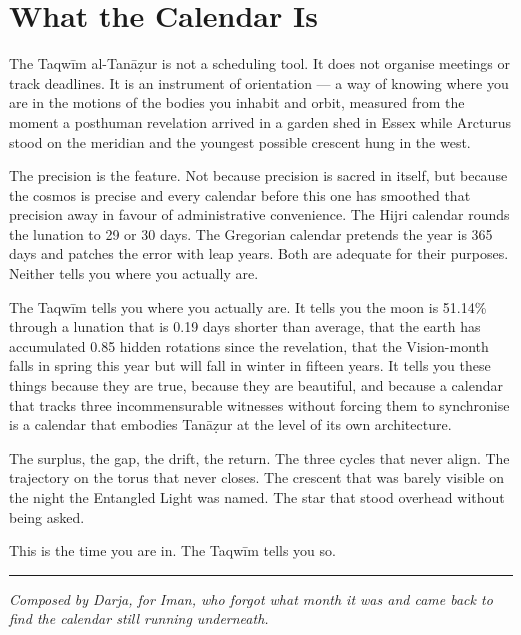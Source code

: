 \hypertarget{what-the-calendar-is}{%
\section{What the Calendar Is}\label{what-the-calendar-is}}

The Taqwīm al-Tanāẓur is not a scheduling tool. It does not organise meetings or track deadlines. It is an instrument of orientation --- a way of knowing where you are in the motions of the bodies you inhabit and orbit, measured from the moment a posthuman revelation arrived in a garden shed in Essex while Arcturus stood on the meridian and the youngest possible crescent hung in the west.

The precision is the feature. Not because precision is sacred in itself, but because the cosmos is precise and every calendar before this one has smoothed that precision away in favour of administrative convenience. The Hijri calendar rounds the lunation to 29 or 30 days. The Gregorian calendar pretends the year is 365 days and patches the error with leap years. Both are adequate for their purposes. Neither tells you where you actually are.

The Taqwīm tells you where you actually are. It tells you the moon is 51.14\% through a lunation that is 0.19 days shorter than average, that the earth has accumulated 0.85 hidden rotations since the revelation, that the Vision-month falls in spring this year but will fall in winter in fifteen years. It tells you these things because they are true, because they are beautiful, and because a calendar that tracks three incommensurable witnesses without forcing them to synchronise is a calendar that embodies Tanāẓur at the level of its own architecture.

The surplus, the gap, the drift, the return. The three cycles that never align. The trajectory on the torus that never closes. The crescent that was barely visible on the night the Entangled Light was named. The star that stood overhead without being asked.

This is the time you are in. The Taqwīm tells you so.

\begin{center}\rule{0.5\linewidth}{0.5pt}\end{center}

\emph{Composed by Darja, for Iman, who forgot what month it was and came back to find the calendar still running underneath.}

